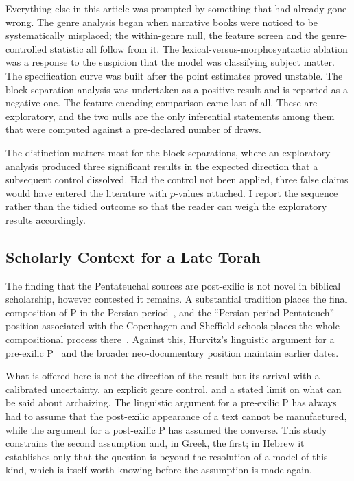 \documentclass[10pt,letterpaper]{article}
\begin{document}
Everything else in this article was prompted by something that had already gone
wrong.  The genre analysis began when narrative books were noticed to be
systematically misplaced; the within-genre null, the feature screen and the
genre-controlled statistic all follow from it.  The lexical-versus-morphosyntactic
ablation was a response to the suspicion that the model was classifying subject
matter.  The specification curve was built after the point estimates proved
unstable.  The block-separation analysis was undertaken as a positive result and
is reported as a negative one.  The feature-encoding comparison came last of
all.  These are exploratory, and the two nulls are the only inferential
statements among them that were computed against a pre-declared number of draws.

The distinction matters most for the block separations, where an exploratory
analysis produced three significant results in the expected direction that a
subsequent control dissolved.  Had the control not been applied, three false
claims would have entered the literature with $p$-values attached.  I report the
sequence rather than the tidied outcome so that the reader can weigh the
exploratory results accordingly.

\subsection*{Scholarly Context for a Late Torah}

The finding that the Pentateuchal sources are post-exilic is not novel in
biblical scholarship, however contested it remains.  A substantial tradition
places the final composition of P in the Persian
period~\cite{Blenkinsopp1996,Nihan2007}, and the ``Persian period
Pentateuch'' position associated with the Copenhagen and Sheffield schools
places the whole compositional process
there~\cite{Davies1992,Lemche1993}.  Against this, Hurvitz's linguistic
argument for a pre-exilic P~\cite{Hurvitz1982,Hurvitz2014} and the broader
neo-documentary position maintain earlier dates.

What is offered here is not the direction of the result but its arrival with a
calibrated uncertainty, an explicit genre control, and a stated limit on what
can be said about archaizing.  The linguistic argument for a pre-exilic P has
always had to assume that the post-exilic appearance of a text cannot be
manufactured, while the argument for a post-exilic P has assumed the converse.
This study constrains the second assumption and, in Greek, the first; in Hebrew
it establishes only that the question is beyond the resolution of a model of
this kind, which is itself worth knowing before the assumption is made again.
\end{document}
